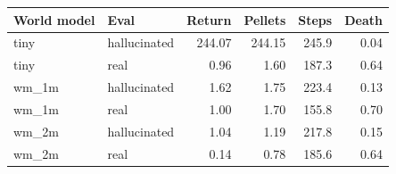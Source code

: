 \begin{tabular}{llrrrr}
\toprule
World model & Eval & Return & Pellets & Steps & Death \\
\midrule
tiny & hallucinated & 244.07 & 244.15 & 245.9 & 0.04 \\
tiny & real & 0.96 & 1.60 & 187.3 & 0.64 \\
wm\_1m & hallucinated & 1.62 & 1.75 & 223.4 & 0.13 \\
wm\_1m & real & 1.00 & 1.70 & 155.8 & 0.70 \\
wm\_2m & hallucinated & 1.04 & 1.19 & 217.8 & 0.15 \\
wm\_2m & real & 0.14 & 0.78 & 185.6 & 0.64 \\
\bottomrule
\end{tabular}
